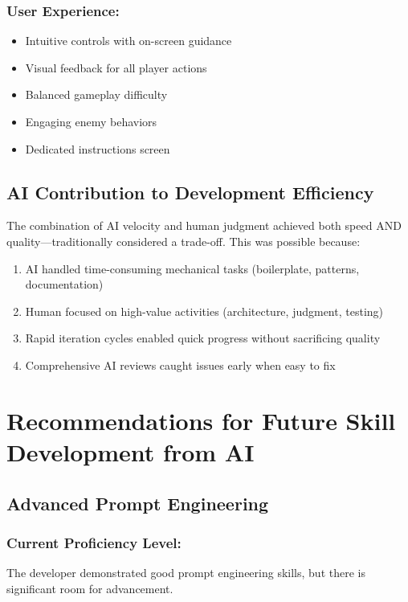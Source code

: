 \documentclass[12pt,a4paper]{article}
\begin{document}
\subsubsection*{User Experience:}
\begin{itemize}
    \item Intuitive controls with on-screen guidance
    \item Visual feedback for all player actions
    \item Balanced gameplay difficulty
    \item Engaging enemy behaviors
    \item Dedicated instructions screen
\end{itemize}

\subsection{AI Contribution to Development Efficiency}

The combination of AI velocity and human judgment achieved both speed AND quality---traditionally considered a trade-off. This was possible because:
\begin{enumerate}
    \item AI handled time-consuming mechanical tasks (boilerplate, patterns, documentation)
    \item Human focused on high-value activities (architecture, judgment, testing)
    \item Rapid iteration cycles enabled quick progress without sacrificing quality
    \item Comprehensive AI reviews caught issues early when easy to fix

\end{enumerate}

\newpage

\section{Recommendations for Future Skill Development from AI}

\subsection{Advanced Prompt Engineering}

\subsubsection*{Current Proficiency Level:}
The developer demonstrated good prompt engineering skills, but there is significant room for advancement.
\end{document}
